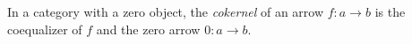 In a category with a zero object, the \emph{cokernel} of an arrow $f: a \to b$ is the coequalizer of $f$ and the zero arrow $0: a \to b$.
